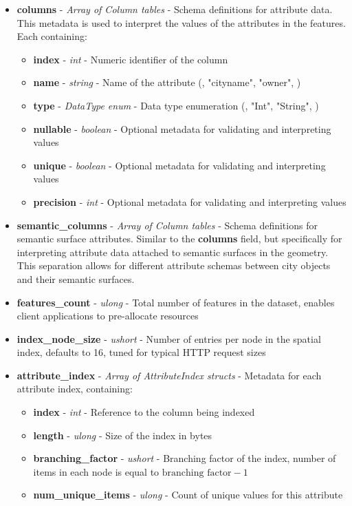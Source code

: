 \begin{itemize}
  \item \textbf{columns} - \textit{Array of Column tables} - Schema definitions for attribute data. This metadata is used to interpret the values of the attributes in the features. Each containing:
    \begin{itemize}
      \item \textbf{index} - \textit{int} - Numeric identifier of the column
      \item \textbf{name} - \textit{string} - Name of the attribute (\eg, "cityname", "owner", \etc)
      \item \textbf{type} - \textit{DataType enum} - Data type enumeration (\eg, "Int", "String", \etc)
      \item \textbf{nullable} - \textit{boolean} - Optional metadata for validating and interpreting values
      \item \textbf{unique} - \textit{boolean} - Optional metadata for validating and interpreting values
      \item \textbf{precision} - \textit{int} - Optional metadata for validating and interpreting values
    \end{itemize}

  \item \textbf{semantic\_columns} - \textit{Array of Column tables} - Schema definitions for semantic surface attributes. Similar to the \textbf{columns} field, but specifically for interpreting attribute data attached to semantic surfaces in the geometry. This separation allows for different attribute schemas between city objects and their semantic surfaces.

  \item \textbf{features\_count} - \textit{ulong} - Total number of features in the dataset, enables client applications to pre-allocate resources

  \item \textbf{index\_node\_size} - \textit{ushort} - Number of entries per node in the spatial index, defaults to 16, tuned for typical HTTP request sizes

  \item \textbf{attribute\_index} - \textit{Array of AttributeIndex structs} - Metadata for each attribute index, containing:
    \begin{itemize}
      \item \textbf{index} - \textit{int} - Reference to the column being indexed
      \item \textbf{length} - \textit{ulong} - Size of the index in bytes
      \item \textbf{branching\_factor} - \textit{ushort} - Branching factor of the index, number of items in each node is equal to $\text{branching factor} - 1$
      \item \textbf{num\_unique\_items} - \textit{ulong} - Count of unique values for this attribute
    \end{itemize}
\end{itemize}


